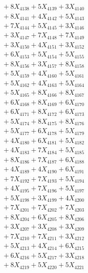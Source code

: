 \documentclass[a4paper,10pt]{article}
\begin{document}
{\begin{align}
&\;  + 8 X_{4138} + 5 X_{4139} + 3 X_{4140} \\[0.3ex]
&\;  + 8 X_{4141} + 4 X_{4142} + 5 X_{4143} \\[0.3ex]
&\;  + 7 X_{4144} + 5 X_{4145} + 3 X_{4146} \\[0.3ex]
&\;  + 3 X_{4147} + 7 X_{4148} + 7 X_{4149} \\[0.5ex]\allowbreak
&\;  + 3 X_{4150} + 4 X_{4151} + 3 X_{4152} \\[0.3ex]
&\;  + 6 X_{4153} + 5 X_{4154} + 5 X_{4155} \\[0.3ex]
&\;  + 8 X_{4156} + 3 X_{4157} + 8 X_{4158} \\[0.3ex]
&\;  + 5 X_{4159} + 4 X_{4160} + 5 X_{4161} \\[0.3ex]
&\;  + 5 X_{4162} + 4 X_{4163} + 5 X_{4164} \\[0.3ex]
&\;  + 5 X_{4165} + 8 X_{4166} + 8 X_{4167} \\[0.3ex]
&\;  + 6 X_{4168} + 8 X_{4169} + 6 X_{4170} \\[0.3ex]
&\;  + 6 X_{4171} + 8 X_{4172} + 6 X_{4173} \\[0.3ex]
&\;  + 5 X_{4174} + 8 X_{4175} + 8 X_{4176} \\[0.3ex]
&\;  + 5 X_{4177} + 6 X_{4178} + 5 X_{4179} \\[0.5ex]\allowbreak
&\;  + 4 X_{4180} + 6 X_{4181} + 5 X_{4182} \\[0.3ex]
&\;  + 4 X_{4183} + 7 X_{4184} + 5 X_{4185} \\[0.3ex]
&\;  + 8 X_{4186} + 7 X_{4187} + 6 X_{4188} \\[0.3ex]
&\;  + 4 X_{4189} + 4 X_{4190} + 6 X_{4191} \\[0.3ex]
&\;  + 7 X_{4192} + 7 X_{4193} + 5 X_{4194} \\[0.3ex]
&\;  + 4 X_{4195} + 7 X_{4196} + 5 X_{4197} \\[0.3ex]
&\;  + 5 X_{4198} + 3 X_{4199} + 4 X_{4200} \\[0.3ex]
&\;  + 7 X_{4201} + 7 X_{4202} + 7 X_{4203} \\[0.3ex]
&\;  + 8 X_{4204} + 6 X_{4205} + 8 X_{4206} \\[0.3ex]
&\;  + 3 X_{4207} + 3 X_{4208} + 3 X_{4209} \\[0.5ex]\allowbreak
&\;  + 7 X_{4210} + 7 X_{4211} + 3 X_{4212} \\[0.3ex]
&\;  + 5 X_{4213} + 4 X_{4214} + 6 X_{4215} \\[0.3ex]
&\;  + 6 X_{4216} + 5 X_{4217} + 3 X_{4218} \\[0.3ex]
&\;  + 8 X_{4219} + 5 X_{4220} + 5 X_{4221} \\[0.3ex]

\end{align}}
\end{document}
